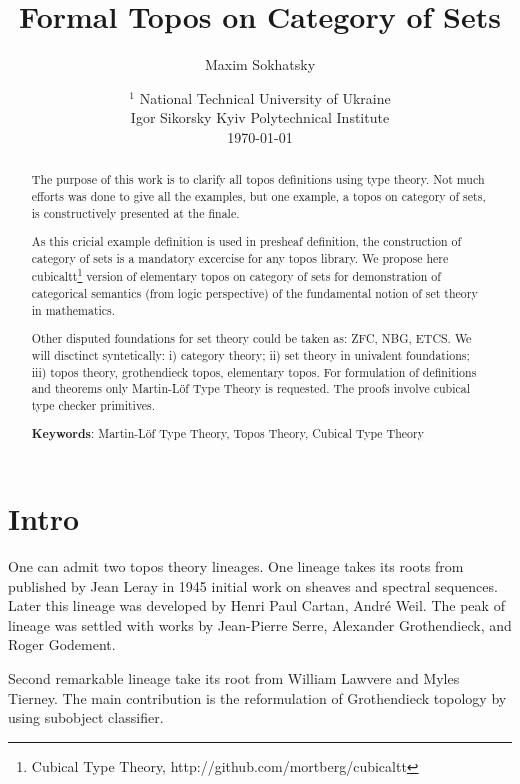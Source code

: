\documentclass{article}
\theoremstyle{definition}
\begin{document}
\title{Formal Topos on Category of Sets}
\author{Maxim Sokhatsky}
\date{
    $^1$ National Technical University of Ukraine \\
    \small Igor Sikorsky Kyiv Polytechnical Institute\\
    \today
}

\maketitle

\begin{abstract}

The purpose of this work is to clarify all topos definitions using type theory.
Not much efforts was done to give all the examples, but one example, a topos
on category of sets, is constructively presented at the finale.

As this cricial example definition is used in presheaf definition,
the construction of category of sets is a mandatory excercise for any topos library.
We propose here cubicaltt\footnote{Cubical Type Theory, http://github.com/mortberg/cubicaltt}
version of elementary topos on category of sets for demonstration of categorical
semantics (from logic perspective) of the fundamental notion of set theory in mathematics.

Other disputed foundations for set theory could be taken as:
ZFC, NBG, ETCS. We will disctinct syntetically: i) category theory;
ii) set theory in univalent foundations; iii) topos theory, grothendieck topos,
elementary topos. For formulation of definitions and theorems only Martin-Löf
Type Theory is requested. The proofs involve cubical type checker primitives.

{\bf Keywords}: Martin-Löf Type Theory, Topos Theory, Cubical Type Theory
\end{abstract}
\tableofcontents
\newpage

\section*{Intro}

One can admit two topos theory lineages. One lineage takes its roots from published
by Jean Leray in 1945 initial work on sheaves and spectral sequences. Later this lineage
was developed by Henri Paul Cartan, André Weil. The peak of lineage was settled
with works by Jean-Pierre Serre, Alexander Grothendieck, and Roger Godement.

Second remarkable lineage take its root from William Lawvere and
Myles Tierney. The main contribution is the reformulation of Grothendieck topology
by using subobject classifier.
\end{document}
